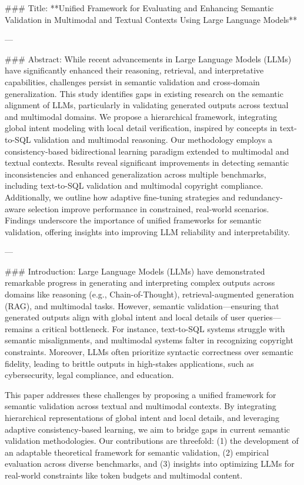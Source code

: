 ### Title:
**Unified Framework for Evaluating and Enhancing Semantic Validation in Multimodal and Textual Contexts Using Large Language Models**

---

### Abstract:
While recent advancements in Large Language Models (LLMs) have significantly enhanced their reasoning, retrieval, and interpretative capabilities, challenges persist in semantic validation and cross-domain generalization. This study identifies gaps in existing research on the semantic alignment of LLMs, particularly in validating generated outputs across textual and multimodal domains. We propose a hierarchical framework, integrating global intent modeling with local detail verification, inspired by concepts in text-to-SQL validation and multimodal reasoning. Our methodology employs a consistency-based bidirectional learning paradigm extended to multimodal and textual contexts. Results reveal significant improvements in detecting semantic inconsistencies and enhanced generalization across multiple benchmarks, including text-to-SQL validation and multimodal copyright compliance. Additionally, we outline how adaptive fine-tuning strategies and redundancy-aware selection improve performance in constrained, real-world scenarios. Findings underscore the importance of unified frameworks for semantic validation, offering insights into improving LLM reliability and interpretability.

---

### Introduction:
Large Language Models (LLMs) have demonstrated remarkable progress in generating and interpreting complex outputs across domains like reasoning (e.g., Chain-of-Thought), retrieval-augmented generation (RAG), and multimodal tasks. However, semantic validation—ensuring that generated outputs align with global intent and local details of user queries—remains a critical bottleneck. For instance, text-to-SQL systems struggle with semantic misalignments, and multimodal systems falter in recognizing copyright constraints. Moreover, LLMs often prioritize syntactic correctness over semantic fidelity, leading to brittle outputs in high-stakes applications, such as cybersecurity, legal compliance, and education.

This paper addresses these challenges by proposing a unified framework for semantic validation across textual and multimodal contexts. By integrating hierarchical representations of global intent and local details, and leveraging adaptive consistency-based learning, we aim to bridge gaps in current semantic validation methodologies. Our contributions are threefold: (1) the development of an adaptable theoretical framework for semantic validation, (2) empirical evaluation across diverse benchmarks, and (3) insights into optimizing LLMs for real-world constraints like token budgets and multimodal content.

